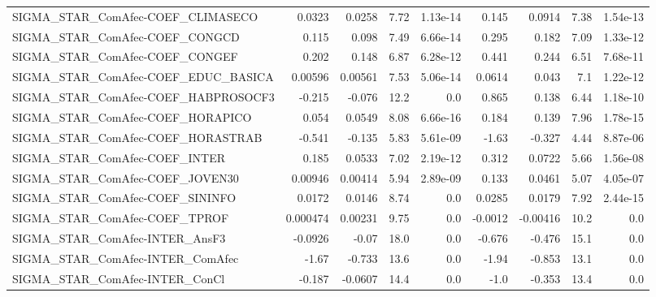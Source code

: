 \begin{tabular}{lrrrrrrrr}
SIGMA\_STAR\_ComAfec-COEF\_CLIMASECO   &      0.0323 &       0.0258 &    7.72 & 1.13e-14 &      0.145 &      0.0914 &         7.38 &      1.54e-13 \\
SIGMA\_STAR\_ComAfec-COEF\_CONGCD      &       0.115 &        0.098 &    7.49 & 6.66e-14 &      0.295 &       0.182 &         7.09 &      1.33e-12 \\
SIGMA\_STAR\_ComAfec-COEF\_CONGEF      &       0.202 &        0.148 &    6.87 & 6.28e-12 &      0.441 &       0.244 &         6.51 &      7.68e-11 \\
SIGMA\_STAR\_ComAfec-COEF\_EDUC\_BASICA &     0.00596 &      0.00561 &    7.53 & 5.06e-14 &     0.0614 &       0.043 &          7.1 &      1.22e-12 \\
SIGMA\_STAR\_ComAfec-COEF\_HABPROSOCF3 &      -0.215 &       -0.076 &    12.2 &      0.0 &      0.865 &       0.138 &         6.44 &      1.18e-10 \\
SIGMA\_STAR\_ComAfec-COEF\_HORAPICO    &       0.054 &       0.0549 &    8.08 & 6.66e-16 &      0.184 &       0.139 &         7.96 &      1.78e-15 \\
SIGMA\_STAR\_ComAfec-COEF\_HORASTRAB   &      -0.541 &       -0.135 &    5.83 & 5.61e-09 &      -1.63 &      -0.327 &         4.44 &      8.87e-06 \\
SIGMA\_STAR\_ComAfec-COEF\_INTER       &       0.185 &       0.0533 &    7.02 & 2.19e-12 &      0.312 &      0.0722 &         5.66 &      1.56e-08 \\
SIGMA\_STAR\_ComAfec-COEF\_JOVEN30     &     0.00946 &      0.00414 &    5.94 & 2.89e-09 &      0.133 &      0.0461 &         5.07 &      4.05e-07 \\
SIGMA\_STAR\_ComAfec-COEF\_SININFO     &      0.0172 &       0.0146 &    8.74 &      0.0 &     0.0285 &      0.0179 &         7.92 &      2.44e-15 \\
SIGMA\_STAR\_ComAfec-COEF\_TPROF       &    0.000474 &      0.00231 &    9.75 &      0.0 &    -0.0012 &    -0.00416 &         10.2 &           0.0 \\
SIGMA\_STAR\_ComAfec-INTER\_AnsF3      &     -0.0926 &        -0.07 &    18.0 &      0.0 &     -0.676 &      -0.476 &         15.1 &           0.0 \\
SIGMA\_STAR\_ComAfec-INTER\_ComAfec    &       -1.67 &       -0.733 &    13.6 &      0.0 &      -1.94 &      -0.853 &         13.1 &           0.0 \\
SIGMA\_STAR\_ComAfec-INTER\_ConCl      &      -0.187 &      -0.0607 &    14.4 &      0.0 &       -1.0 &      -0.353 &         13.4 &           0.0 \\

\end{tabular}
